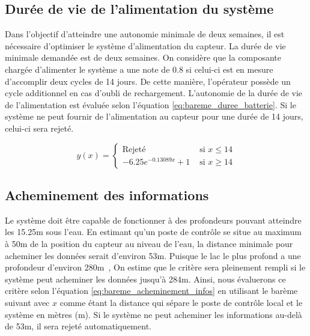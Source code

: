 \subsection{Durée de vie de l'alimentation du système}

Dans l'objectif d'atteindre une autonomie minimale de deux semaines, il est nécessaire d'optimiser le système d'alimentation du capteur. %
La durée de vie minimale demandée est de deux semaines. On considère que la composante chargée d'alimenter le système a une note de 0.8 si celui-ci est en mesure d'accomplir deux cycles de 14 jours. De cette manière, l'opérateur possède un cycle additionnel en cas d'oubli de rechargement. L'autonomie de la durée de vie de l'alimentation est évaluée selon l'équation \ref{eq:bareme_duree_batterie}. Si le système ne peut fournir de l'alimentation au capteur pour une durée de 14 jours, celui-ci sera rejeté.

\begin{equation}
    y(x) = \begin{cases}
        \text{Rejeté} & \text{ si } x \le 14 \\
        -6.25 e^{-0.13089x}+1 & \text{ si } x \geq 14
    \end{cases}
    \label{eq:bareme_duree_batterie}
\end{equation}


\subsection{Acheminement des informations}

Le système doit être capable de fonctionner à des profondeurs pouvant atteindre les 15.25m sous l’eau. En estimant qu'un poste de contrôle se situe au maximum à 50m de la position du capteur au niveau de l'eau, la distance minimale pour acheminer les données serait d'environ 53m. Puisque le lac le plus profond a une profondeur d'environ 280m~\cite{Lac_walker}, On estime que le critère sera pleinement rempli si le système peut acheminer les données jusqu'à 284m. Ainsi, nous évaluerons ce critère selon l'équation \ref{eq:bareme_acheminement_infos} en utilisant le barème suivant avec $x$ comme étant la distance qui sépare le poste de contrôle local et le système en mètres (m). Si le système ne peut acheminer les informations au-delà de 53m, il sera rejeté automatiquement.

